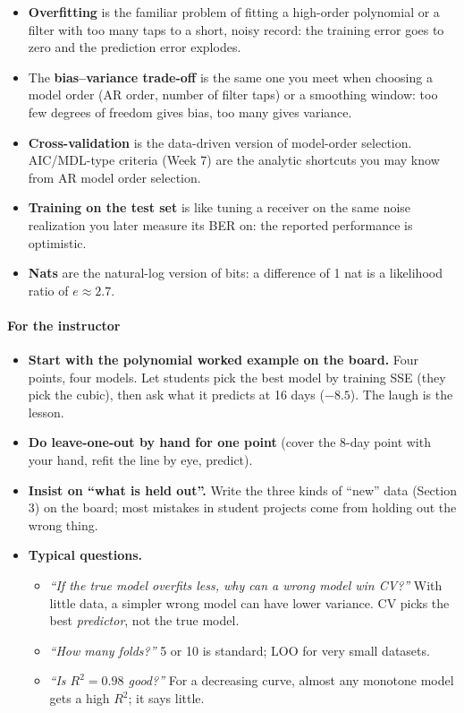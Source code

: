 \begin{itemize}
\tightlist
\item
  \textbf{Overfitting} is the familiar problem of fitting a high-order
  polynomial or a filter with too many taps to a short, noisy record:
  the training error goes to zero and the prediction error explodes.
\item
  The \textbf{bias--variance trade-off} is the same one you meet when
  choosing a model order (AR order, number of filter taps) or a
  smoothing window: too few degrees of freedom gives bias, too many
  gives variance.
\item
  \textbf{Cross-validation} is the data-driven version of model-order
  selection. AIC/MDL-type criteria (Week 7) are the analytic shortcuts
  you may know from AR model order selection.
\item
  \textbf{Training on the test set} is like tuning a receiver on the
  same noise realization you later measure its BER on: the reported
  performance is optimistic.
\item
  \textbf{Nats} are the natural-log version of bits: a difference of 1
  nat is a likelihood ratio of \(e \approx 2.7\).
\end{itemize}

\paragraph{For the instructor}

\begin{itemize}
\tightlist
\item
  \textbf{Start with the polynomial worked example on the board.} Four
  points, four models. Let students pick the best model by training SSE
  (they pick the cubic), then ask what it predicts at 16 days
  (\(-8.5\)). The laugh is the lesson.
\item
  \textbf{Do leave-one-out by hand for one point} (cover the 8-day point
  with your hand, refit the line by eye, predict).
\item
  \textbf{Insist on ``what is held out''.} Write the three kinds of
  ``new'' data (Section 3) on the board; most mistakes in student
  projects come from holding out the wrong thing.
\item
  \textbf{Typical questions.}

  \begin{itemize}
  \tightlist
  \item
    \emph{``If the true model overfits less, why can a wrong model win
    CV?''} With little data, a simpler wrong model can have lower
    variance. CV picks the best \emph{predictor}, not the true model.
  \item
    \emph{``How many folds?''} 5 or 10 is standard; LOO for very small
    datasets.
  \item
    \emph{``Is \(R^2 = 0.98\) good?''} For a decreasing curve, almost
    any monotone model gets a high \(R^2\); it says little.
  \end{itemize}
\end{itemize}

